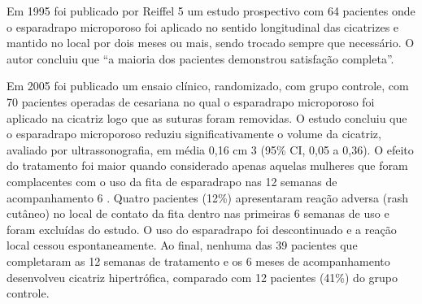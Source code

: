 \begin{multicols}{2}

\par{}Em 1995 foi publicado por Reiffel 5 um estudo
prospectivo com 64 pacientes onde o esparadrapo
microporoso foi aplicado no sentido longitudinal das
cicatrizes e mantido no local por dois meses ou mais,
sendo trocado sempre que necessário. O autor concluiu
que “a maioria dos pacientes demonstrou satisfação
completa”.
\par{}Em 2005 foi publicado um ensaio clínico,
randomizado, com grupo controle, com 70 pacientes
operadas de cesariana no qual o esparadrapo
microporoso foi aplicado na cicatriz logo que as suturas
foram removidas. O estudo concluiu que o esparadrapo
microporoso reduziu significativamente o volume da
cicatriz, avaliado por ultrassonografia, em média 0,16
cm 3 (95\% CI, 0,05 a 0,36). O efeito do tratamento foi maior
quando considerado apenas aquelas mulheres que
foram complacentes com o uso da fita de esparadrapo
nas 12 semanas de acompanhamento 6 . Quatro pacientes
(12\%) apresentaram reação adversa (rash cutâneo)
no local de contato da fita dentro nas primeiras 6
semanas de uso e foram excluídas do estudo. O uso do
esparadrapo foi descontinuado e a reação local cessou
espontaneamente. Ao final, nenhuma das 39 pacientes
que completaram as 12 semanas de tratamento e os
6 meses de acompanhamento desenvolveu cicatriz
hipertrófica, comparado com 12 pacientes (41\%) do
grupo controle.


\lipsum



\lipsum


\lipsum
\lipsum


\lipsum
\lipsum
\lipsum[1]

\begin{scieloReferencesContainer}[REFERÊNCIAS]


\end{scieloReferencesContainer}
\end{multicols}
